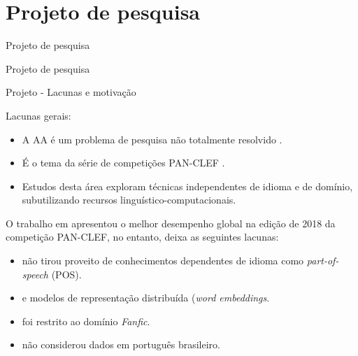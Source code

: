 \section{Projeto de pesquisa}

\begin{frame}{Projeto de pesquisa}
	\begin{block}{ }
	Projeto de pesquisa
	\end{block}
\end{frame}


\begin{frame}{Projeto - Lacunas e motivação}

Lacunas gerais:

\begin{itemize}
	\item A AA é um problema de pesquisa não totalmente resolvido \cite{Potthast2017}.
	\item É o tema da série de competições PAN-CLEF \cite{aa-overview-2018} \cite{Kocher2017Verificacao,Koppel2018_pseud,Varela2016}.
	\item Estudos desta área exploram técnicas independentes de idioma e de domínio, subutilizando  recursos linguístico-computacionais.
\end{itemize}

O trabalho em  apresentou o melhor desempenho global na edição de 2018 da competição PAN-CLEF, no entanto, deixa as seguintes lacunas:
\begin{itemize}
	\item não tirou proveito de conhecimentos dependentes de idioma como {\it part-of-speech} (POS).
	\item e modelos de representação distribuída ({\it word embeddings}.
	\item foi restrito ao domínio {\it Fanfic}.
	\item não considerou dados em português brasileiro.
\end{itemize}

\end{frame}


